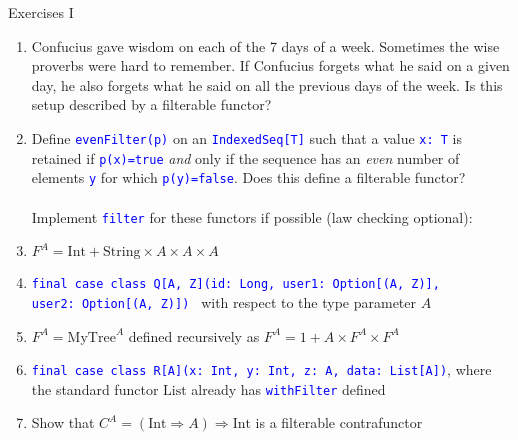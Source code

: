 \documentclass[english]{beamer}
\begin{document}
\begin{frame}{Exercises I}
\begin{enumerate}
\item Confucius gave wisdom on each of the 7 days of a week. Sometimes the
wise proverbs were hard to remember. If Confucius forgets what he
said on a given day, he also forgets what he said on all the previous
days of the week. Is this setup described by a filterable functor?
\item Define \texttt{\textcolor{blue}{\footnotesize{}evenFilter(p)}} on
an \texttt{\textcolor{blue}{\footnotesize{}IndexedSeq{[}T{]}}} such
that a value \texttt{\textcolor{blue}{\footnotesize{}x:\ T}} is retained
if \texttt{\textcolor{blue}{\footnotesize{}p(x)=true}} \emph{and}
only if the sequence has an \emph{even} number of elements \texttt{\textcolor{blue}{\footnotesize{}y}}
for which \texttt{\textcolor{blue}{\footnotesize{}p(y)=false}}. Does
this define a filterable functor?\\
\ \\
Implement \texttt{\textcolor{blue}{\footnotesize{}filter}} for these
functors if possible (law checking optional):
\item $F^{A}=\text{Int}+\text{String}\times A\times A\times A$
\item \texttt{\textcolor{blue}{\footnotesize{}final case class Q{[}A, Z{]}(id:\ Long,
user1:\ Option{[}(A, Z){]}, user2:\ Option{[}(A, Z){]}) }}\textendash{}
with respect to the type parameter $A$
\item $F^{A}=\text{MyTree}^{A}$ defined recursively as $F^{A}=1+A\times F^{A}\times F^{A}$
\item \texttt{\textcolor{blue}{\footnotesize{}final case class R{[}A{]}(x:\ Int,\ y: Int,
z:\ A, data:\ List{[}A{]})}}, where the standard functor $\text{List}$
already has \texttt{\textcolor{blue}{\footnotesize{}withFilter}} defined
\item Show that $C^{A}=(\text{Int}\Rightarrow A)\Rightarrow\text{Int}$
is a filterable contrafunctor
\end{enumerate}
\end{frame}
\end{document}
